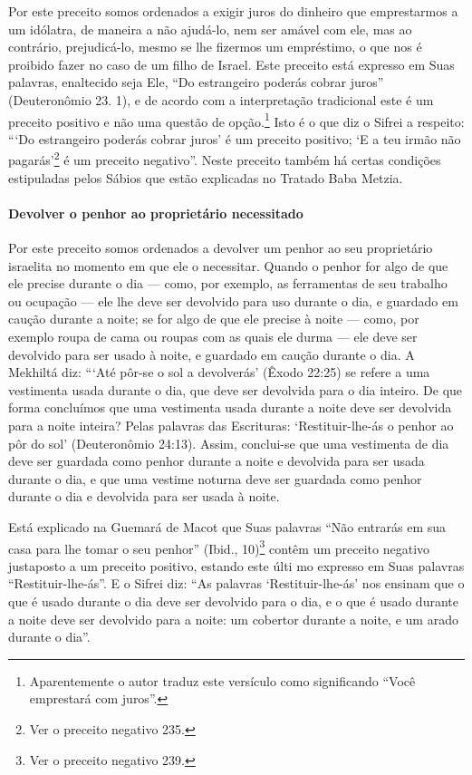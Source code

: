 Por este preceito somos ordenados a exigir juros do dinheiro que
emprestarmos a um idólatra, de maneira a não ajudá-lo, nem ser amável
com ele, mas ao contrário, prejudicá-lo, mesmo se lhe fizermos um
empréstimo, o
que nos é proibido fazer no caso de um filho de Israel. Este preceito
está expresso em Suas palavras, enaltecido seja Ele, ``Do estrangeiro poderás
cobrar juros'' (Deuteronômio 23. 1), e de acordo com a interpretação
tradicional este
é um preceito positivo e não uma questão de opção.\footnote{Aparentemente o autor traduz este versículo como significando ``Você
  emprestará com juros''.}
Isto é o que diz o Sifrei a respeito: ```Do estrangeiro poderás cobrar juros' é um preceito positivo;
`E a teu irmão não pagarás'\footnote{Ver o preceito negativo 235.} é um preceito
negativo''. Neste preceito também
há certas condições estipuladas pelos Sábios que estão explicadas no
Tratado Baba Metzia.

\paragraph{Devolver o penhor ao proprietário necessitado}

Por este preceito somos ordenados a devolver um penhor ao seu
proprietário israelita no momento em que ele o necessitar. Quando o
penhor for algo de que ele precise durante o dia --- como, por exemplo,
as ferramentas de seu trabalho ou ocupação --- ele lhe deve ser
devolvido para uso durante o dia, e guardado em caução durante a noite;
se for algo de que ele precise à noite --- como, por exemplo roupa de
cama ou roupas com as quais ele durma --- ele deve ser devolvido para ser usado à noite, e guardado em caução
durante o dia. A Mekhiltá diz: ```Até pôr-se o sol a devolverás' (Êxodo
22:25) se refere a uma vestimenta usada durante o dia, que deve ser
devolvida para o dia inteiro. De que forma concluímos que uma vestimenta
usada durante a noite deve ser devolvida para a noite inteira? Pelas
palavras das Escrituras: `Restituir-lhe-ás o penhor ao pôr do sol'
(Deuteronômio 24:13). Assim, conclui-se que uma vestimenta de dia deve
ser guardada como penhor durante a noite e devolvida para ser usada
durante o dia, e que uma vestime noturna deve ser guardada como penhor
durante o dia e devolvida para ser usada à noite.


Está explicado na Guemará de Macot que Suas palavras ``Não entrarás em sua casa para lhe tomar o seu penhor'' (Ibid., 10)\footnote{Ver o preceito negativo 239.} contêm um preceito
negativo justaposto a um preceito positivo, estando este últi mo
expresso em Suas palavras ``Restituir-lhe-ás''. E o Sifrei diz: ``As palavras
`Restituir-lhe-ás' nos
ensinam que o que é usado durante o dia deve ser devolvido para o dia, e
o que é usado durante a noite deve ser devolvido para a noite: um
cobertor durante a noite, e um arado durante o dia''.

